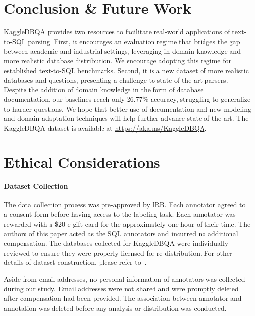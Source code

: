 \documentclass[11pt,a4paper]{article}
\newcommand{\systemname}{\mbox{KaggleDBQA}\xspace}
\begin{document}
 \section{Conclusion \& Future Work}
\systemname provides two resources to facilitate real-world
applications of text-to-SQL parsing.
First, it encourages an evaluation regime that bridges the gap between academic and industrial settings, leveraging
in-domain knowledge and more realistic database distribution.
We encourage adopting this regime for established text-to-SQL benchmarks.
Second, it is a new dataset of more realistic databases and questions, presenting a challenge to
state-of-the-art parsers.
Despite the addition of domain knowledge in the form of database documentation,
our baselines reach only 26.77\% accuracy, struggling to generalize to harder questions.
We hope that better use of documentation and new modeling and domain adaptation techniques will help further advance
state of the art.
The \systemname dataset is available at \mbox{\url{https://aka.ms/KaggleDBQA}}.

 \section*{Ethical Considerations}








\paragraph{Dataset Collection}
The data collection process was pre-approved by IRB.
Each annotator agreed to a consent form before having access to the labeling task. 
Each annotator was rewarded with a \$20 e-gift card for the approximately one hour of their time.
The authors of this paper acted as the SQL annotators and incurred no additional compensation. The databases collected for \systemname were individually reviewed to ensure they were properly licensed for re-distribution.
For other details of dataset construction, please refer to~.

Aside from email addresses, no personal information of annotators was collected during our study. Email addresses were not shared and were promptly deleted after compensation had been provided. The association between annotator and annotation was deleted before any analysis or distribution was conducted.
\end{document}

